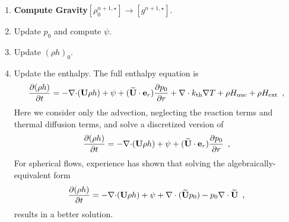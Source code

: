 \begin{description}
\begin{enumerate}
\item {\bf Compute Gravity}$[\rho_0^{n+1,\star}] \rightarrow [g^{n+1,\star}]$.

\item Update $p_0$ and compute $\psi$.

\item Update $(\rho h)_0$.

\item Update the enthalpy.  The full enthalpy equation is 
  \begin{equation}
  \frac{\partial (\rho h)}{\partial t}  = - \mathbf{\nabla} \mathbf{\cdot} ({\bf U} \rho h)
+ \psi + (\widetilde{{\bf U}} \cdot \mathbf{e}_r) \frac{\partial p_0}{\partial r} + \nabla\cdot k_{\rm th}\nabla T + \rho {H_{\rm nuc}} + \rho {H_{\rm ext}} 
\enskip , \label{eq:rhohupd} 
  \end{equation}
Here we consider only the advection, neglecting the reaction terms and thermal diffusion terms,
and solve a discretized version of
  \begin{equation}
  \frac{\partial (\rho h)}{\partial t}  = - \mathbf{\nabla} \mathbf{\cdot} ({\bf U} \rho h)
+ \psi + (\widetilde{{\bf U}} \cdot \mathbf{e}_r) \frac{\partial p_0}{\partial r} 
\enskip , \label{eq:rhohupdadv} 
  \end{equation}
For spherical flows, experience has shown that solving the algebraically-equivalent form
\begin{equation}
  \frac{\partial (\rho h)}{\partial t}  = - \mathbf{\nabla} \mathbf{\cdot} ({\bf U} \rho h)
+ \psi + \nabla \cdot (\widetilde{{\bf U}} p_0) - p_0 \nabla \cdot \widetilde{{\bf U}}  
\enskip , \label{eq:rhohupdadv2} 
\end{equation}
results in a better solution.



\end{enumerate}
\end{description}
